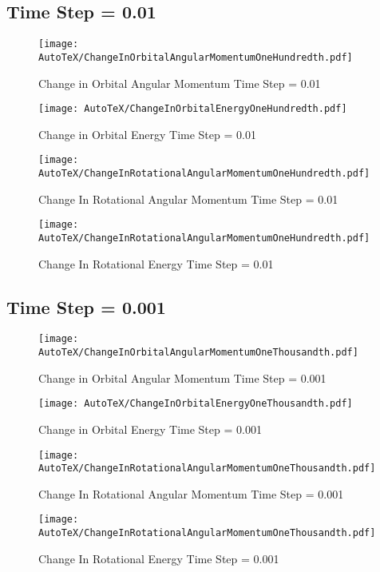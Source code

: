 \subsection{Time Step = 0.01}
\begin{figure}[htbp]
	\centerline{
		\texttt{[image: AutoTeX/ChangeInOrbitalAngularMomentumOneHundredth.pdf]}}
	\caption{Change in Orbital Angular Momentum Time Step = 0.01}
	\label{fig:ChangeInOrbitalAngularMomentumTimeStep01}
\end{figure}
\begin{figure}[htbp]
	\centerline{
		\texttt{[image: AutoTeX/ChangeInOrbitalEnergyOneHundredth.pdf]}}
	\caption{Change in Orbital Energy Time Step = 0.01}
	\label{fig:ChangeInOrbitalEnergyTimeStep01}
\end{figure}
\begin{figure}[htbp]
	\centerline{
		\texttt{[image: AutoTeX/ChangeInRotationalAngularMomentumOneHundredth.pdf]}}
	\caption{Change In Rotational Angular Momentum Time Step = 0.01}
	\label{fig:ChangeInRotationalAngularMomentumTimeStep01}
\end{figure}
\begin{figure}[htbp]
	\centerline{
		\texttt{[image: AutoTeX/ChangeInRotationalAngularMomentumOneHundredth.pdf]}}
	\caption{Change In Rotational Energy Time Step = 0.01}
	\label{fig:ChangeInRotationalEnergyTimeStep01}
\end{figure}
\clearpage

\subsection{Time Step = 0.001}
\begin{figure}[htbp]
	\centerline{
		\texttt{[image: AutoTeX/ChangeInOrbitalAngularMomentumOneThousandth.pdf]}}
	\caption{Change in Orbital Angular Momentum Time Step = 0.001}
	\label{fig:ChangeInOrbitalAngularMomentumTimeStep001}
\end{figure}
\begin{figure}[htbp]
	\centerline{
		\texttt{[image: AutoTeX/ChangeInOrbitalEnergyOneThousandth.pdf]}}
	\caption{Change in Orbital Energy Time Step = 0.001}
	\label{fig:ChangeInOrbitalEnergyTimeStep001}
\end{figure}
\begin{figure}[htbp]
	\centerline{
		\texttt{[image: AutoTeX/ChangeInRotationalAngularMomentumOneThousandth.pdf]}}
	\caption{Change In Rotational Angular Momentum Time Step = 0.001}
	\label{fig:ChangeInRotationalAngularMomentumTimeStep001}
\end{figure}
\begin{figure}[htbp]
	\centerline{
		\texttt{[image: AutoTeX/ChangeInRotationalAngularMomentumOneThousandth.pdf]}}
	\caption{Change In Rotational Energy Time Step = 0.001}
	\label{fig:ChangeInRotationalEnergyTimeStep001}
\end{figure}
\clearpage
